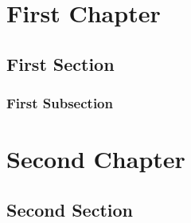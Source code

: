 \documentclass{report}
\begin{document}
\tableofcontents
\chapter{First Chapter}
\section{First Section}
\subsection{First Subsection}
\chapter{Second Chapter}
\section{Second Section}
\end{document}
